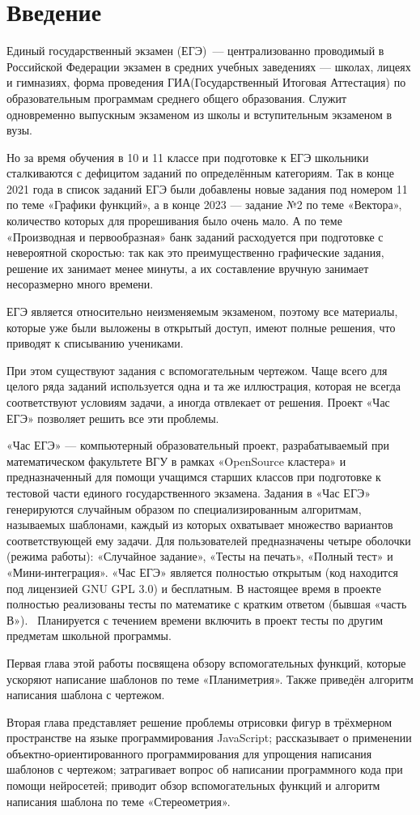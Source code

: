 
\section*{Введение}
Единый государственный экзамен (ЕГЭ)~— централизованно проводимый в Российской
Федерации экзамен в средних учебных заведениях — школах, лицеях и гимназиях,
форма проведения ГИА(Государственный Итоговая Аттестация) по образовательным программам среднего общего образования.
Служит одновременно выпускным экзаменом из школы и вступительным экзаменом в вузы.

Но за время обучения в 10 и 11 классе при подготовке к ЕГЭ школьники сталкиваются с дефицитом заданий по определённым категориям.
Так в конце 2021 года в список заданий ЕГЭ были добавлены новые задания под номером 11 по теме «Графики функций», а в конце 2023 — задание №2 по теме «Вектора», количество которых для прорешивания было очень мало. 
А по теме «Производная и первообразная» банк заданий расходуется при подготовке с невероятной скоростью:
так как это преимущественно графические задания, решение их занимает менее минуты, а их составление вручную занимает несоразмерно много времени.

ЕГЭ является относительно неизменяемым экзаменом, поэтому все материалы, которые уже были выложены в открытый доступ, имеют полные решения, что приводят к списыванию учениками.

При этом существуют задания с вспомогательным чертежом. Чаще всего для целого ряда заданий используется одна и та же иллюстрация, которая не всегда соответствуют условиям задачи, а иногда отвлекает от решения.
Проект «Час ЕГЭ» позволяет решить все эти проблемы.

«Час ЕГЭ» — компьютерный образовательный проект, разрабатываемый при математическом
факультете ВГУ в рамках «OpenSource кластера» и предназначенный для помощи учащимся
старших классов при подготовке к тестовой части единого государственного экзамена.
Задания в «Час ЕГЭ» генерируются случайным образом по специализированным алгоритмам,
называемых шаблонами, каждый из которых
охватывает множество вариантов соответствующей ему задачи. Для
пользователей
предназначены четыре оболочки (режима работы): «Случайное задание», «Тесты на печать»,
«Полный тест» и «Мини-интеграция».
«Час ЕГЭ» является полностью открытым (код находится под лицензией GNU GPL 3.0)
и бесплатным.
В настоящее время в проекте полностью реализованы тесты по математике с кратким
ответом (бывшая «часть В»).~\cite{fipi}
Планируется с течением времени включить в проект тесты по другим предметам школьной
программы.

Первая глава этой работы посвящена обзору вспомогательных функций, которые ускоряют написание шаблонов по теме «Планиметрия». Также приведён алгоритм написания шаблона с чертежом.

Вторая глава представляет решение проблемы отрисовки фигур в трёхмерном пространстве на языке программирования JavaScript; рассказывает о применении объектно-ориентированного программирования для упрощения написания шаблонов с чертежом; затрагивает вопрос об написании программного кода при помощи нейросетей; приводит обзор вспомогательных функций и алгоритм написания шаблона по теме «Стереометрия». 
